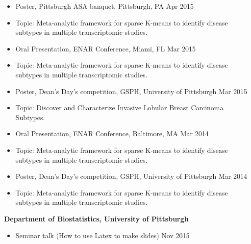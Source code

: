\documentclass[10pt]{article}
\newenvironment{innerlist}[1][\enskip\textbullet]%
        {\begin{itemize}[#1,leftmargin=*,parsep=0pt,itemsep=0pt,topsep=0pt,partopsep=0pt]}
        {\end{itemize}}
\newcommand{\halfblankline}{\quad\vspace{-0.5\baselineskip}\pagebreak[3]}
\begin{document}
\begin{innerlist}
\item Poster, Pittsburgh ASA banquet, Pittsburgh, PA \hfill {Apr 2015}
\item[]  Topic: Meta-analytic framework for sparse K-means to identify disease\\ subtypes in multiple transcriptomic studies.
\end{innerlist}

\begin{innerlist}
\item Oral Presentation, ENAR Conference, Miami, FL \hfill {Mar 2015}
\item[] Topic: Meta-analytic framework for sparse K-means to identify disease\\ subtypes in multiple transcriptomic studies.
\end{innerlist}

\begin{innerlist}
\item Poster, Dean's Day's competition, GSPH, University of Pittsburgh \hfill {Mar 2015}
\item[] Topic: Discover and Characterize Invasive Lobular Breast Carcinoma Subtypes.
\end{innerlist}

\begin{innerlist}
\item Oral Presentation, ENAR Conference, Baltimore, MA \hfill {Mar 2014}
\item[] Topic: Meta-analytic framework for sparse K-means to identify disease\\ subtypes in multiple transcriptomic studies.
\end{innerlist}

\begin{innerlist}
\item Poster, Dean's Day's competition, GSPH, University of Pittsburgh \hfill {Mar 2014}
\item[] Topic: Meta-analytic framework for sparse K-means to identify disease\\ subtypes in multiple transcriptomic studies.
\end{innerlist}

\halfblankline

\textbf{Department of Biostatistics, University of Pittsburgh}
\begin{innerlist}
\item Seminar talk (How to use Latex to make slides) \hfill Nov 2015
\end{innerlist}
\end{document}
